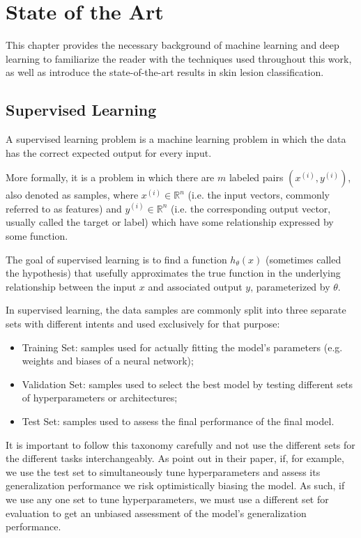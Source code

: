 \chapter{State of the Art}
\label{chapter:sota}

This chapter provides the necessary background of machine learning and deep learning to familiarize the reader with the techniques used throughout this work, as well as introduce the state-of-the-art results in skin lesion classification.

\section{Supervised Learning}

A supervised learning problem is a machine learning problem in which the data has the correct expected output for every input.

More formally, it is a problem in which there are $m$ labeled pairs $(x^{(i)}, y^{(i)})$, also denoted as samples, where $x^{(i)} \in \mathbb{R}^n$ (i.e. the input vectors, commonly referred to as features) and $y^{(i)} \in \mathbb{R}^n$ (i.e. the corresponding output vector, usually called the target or label) which have some relationship expressed by some function.

The goal of supervised learning is to find a function $h_{\theta}(x)$ (sometimes called the hypothesis) that usefully approximates the true function in the underlying relationship between the input $x$ and associated output $y$, parameterized by $\theta$.

In supervised learning, the data samples are commonly split into three separate sets with different intents and used exclusively for that purpose:

\begin{itemize}
    \item Training Set: samples used for actually fitting the model's parameters (e.g. weights and biases of a neural network);
    \item Validation Set: samples used to select the best model by testing different sets of hyperparameters or architectures;
    \item Test Set: samples used to assess the final performance of the final model.
\end{itemize}

It is important to follow this taxonomy carefully and not use the different sets for the different tasks interchangeably. As \citeauthor{crossvalidationbias} point out in their \citeyear{crossvalidationbias} paper, if, for example, we use the test set to simultaneously tune hyperparameters and assess its generalization performance we risk optimistically biasing the model. As such, if we use any one set to tune hyperparameters, we must use a different set for evaluation to get an unbiased assessment of the model's generalization performance.

